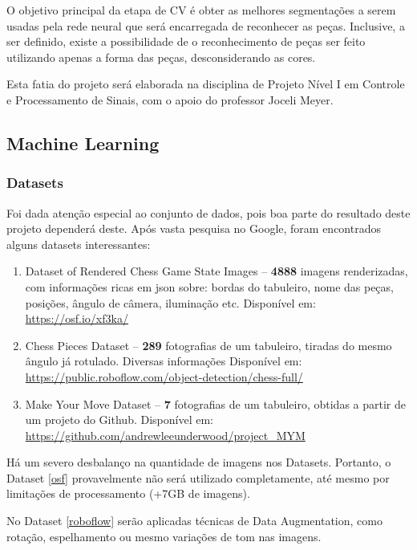 \documentclass[a4paper,12pt,twoside]{article}
\begin{document}
O objetivo principal da etapa de CV é obter as melhores segmentações a serem usadas pela rede neural
que será encarregada de reconhecer as peças.
Inclusive, a ser definido, existe a possibilidade de o reconhecimento de peças ser feito utilizando apenas a forma das peças,
desconsiderando as cores.

Esta fatia do projeto será elaborada na disciplina de Projeto Nível I em Controle e Processamento de Sinais,
com o apoio do professor Joceli Meyer.

\subsection{Machine Learning}

\subsubsection{Datasets}

Foi dada atenção especial ao conjunto de dados,
pois boa parte do resultado deste projeto dependerá deste.
Após vasta pesquisa no Google, foram encontrados alguns datasets interessantes:

\begin{enumerate}
    \item{Dataset of Rendered Chess Game State Images –
          \textbf{4888} imagens renderizadas, com informações ricas em json sobre: bordas do tabuleiro, nome das peças, posições, ângulo de câmera, iluminação etc.
      Disponível em: \url{https://osf.io/xf3ka/}}\label{osf}
    \item{Chess Pieces Dataset –
          \textbf{289} fotografias de um tabuleiro, tiradas do mesmo ângulo já rotulado. Diversas informações
      Disponível em: \url{https://public.roboflow.com/object-detection/chess-full/}}\label{roboflow}
    \item{Make Your Move Dataset –
          \textbf{7} fotografias de um tabuleiro, obtidas a partir de um projeto do Github.
      Disponível em: \url{https://github.com/andrewleeunderwood/project\_MYM}}\label{MYM}
\end{enumerate}

Há um severo desbalanço na quantidade de imagens nos Datasets.
Portanto, o Dataset \ref{osf} provavelmente não será utilizado completamente,
até mesmo por limitações de processamento (+7GB de imagens).

No Dataset \ref{roboflow} serão aplicadas técnicas de Data Augmentation,
como rotação, espelhamento ou mesmo variações de tom nas imagens.
\end{document}

